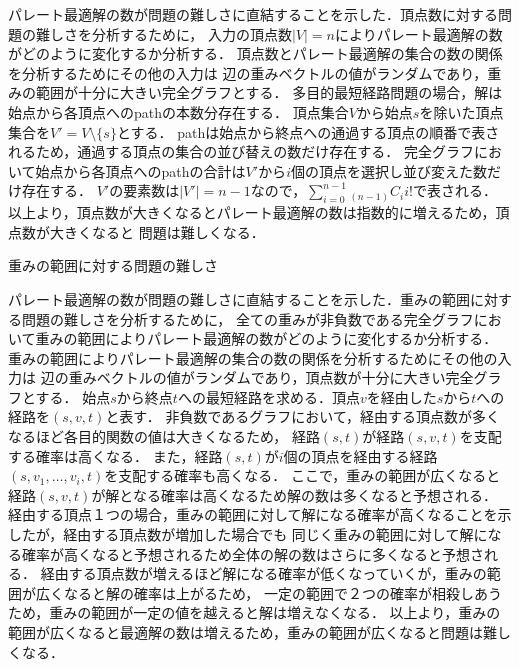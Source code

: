 \documentclass[12pt]{optlab-bachelor}
\begin{document}
パレート最適解の数が問題の難しさに直結することを示した．頂点数に対する問題の難しさを分析するために，
入力の頂点数$|V|=n$によりパレート最適解の数がどのように変化するか分析する．
頂点数とパレート最適解の集合の数の関係を分析するためにその他の入力は
辺の重みベクトルの値がランダムであり，重みの範囲が十分に大きい完全グラフとする．
多目的最短経路問題の場合，解は始点から各頂点へのpathの本数分存在する．
頂点集合$V$から始点$s$を除いた頂点集合を$V'=V \setminus \{s\}$とする．
pathは始点から終点への通過する頂点の順番で表されるため，通過する頂点の集合の並び替えの数だけ存在する．
完全グラフにおいて始点から各頂点へのpathの合計は$V'$から$i$個の頂点を選択し並び変えた数だけ存在する．
$V'$の要素数は$|V'|=n-1$なので，$\displaystyle \sum_{i=0}^{n-1} {}_{(n-1)}C_i i!$で表される．
以上より，頂点数が大きくなるとパレート最適解の数は指数的に増えるため，頂点数が大きくなると
問題は難しくなる．

\begin{description}
  \item[重みの範囲に対する問題の難しさ]
\end{description}

パレート最適解の数が問題の難しさに直結することを示した．重みの範囲に対する問題の難しさを分析するために，
全ての重みが非負数である完全グラフにおいて重みの範囲によりパレート最適解の数がどのように変化するか分析する．
重みの範囲によりパレート最適解の集合の数の関係を分析するためにその他の入力は
辺の重みベクトルの値がランダムであり，頂点数が十分に大きい完全グラフとする．
始点$s$から終点$t$への最短経路を求める．頂点$v$を経由した$s$から$t$への経路を$(s,v,t)$と表す．
非負数であるグラフにおいて，経由する頂点数が多くなるほど各目的関数の値は大きくなるため，
経路$(s,t)$が経路$(s,v,t)$を支配する確率は高くなる．
また，経路$(s,t)$が$i$個の頂点を経由する経路$(s,v_1,\ldots,v_i,t)$を支配する確率も高くなる．
ここで，重みの範囲が広くなると経路$(s,v,t)$が解となる確率は高くなるため解の数は多くなると予想される．
経由する頂点１つの場合，重みの範囲に対して解になる確率が高くなることを示したが，経由する頂点数が増加した場合でも
同じく重みの範囲に対して解になる確率が高くなると予想されるため全体の解の数はさらに多くなると予想される．
経由する頂点数が増えるほど解になる確率が低くなっていくが，重みの範囲が広くなると解の確率は上がるため，
一定の範囲で２つの確率が相殺しあうため，重みの範囲が一定の値を越えると解は増えなくなる．
以上より，重みの範囲が広くなると最適解の数は増えるため，重みの範囲が広くなると問題は難しくなる．
\end{document}
